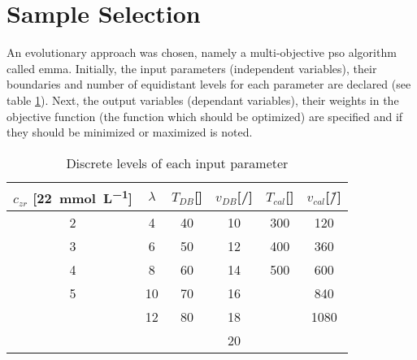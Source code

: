 \section{Sample Selection}
\label{sec:ss}
An evolutionary approach was chosen, namely a multi-objective 
\gls{pso} algorithm called \gls{emma}\cite{villanova2010function,Kennedy1995,Breiman1997,Carta2011}.
%
%
Initially, the input parameters (independent variables), their boundaries and number of equidistant levels for each parameter are declared (see table \ref{tab:input}).
Next, the output variables (dependant variables), their weights in the objective function (the function which should be optimized) are specified and if they should be minimized or maximized is noted.
%
\begin{table}[htb]
	\centering
	\begin{tabular}{cc cc cc}
		\hline\hline
        $c_{zr}$ [\SI{22}{\milli\mol\per\liter}]	&$\lambda$	&$T_{DB}$[\oc{}]	&$v_{DB}$[\mm{}/\s{}]	&$T_{cal}$[\oc{}]	&$v_{cal}$[\oc{}/\h{}]	\\
		\hline
		2				&4		&40					&10				&300				&120	\\
		3				&6		&50					&12				&400				&360	\\
		4				&8		&60					&14				&500				&600	\\
		5				&10		&70					&16				&					&840	\\
						&12		&80					&18				&					&1080	\\
						&		&					&20				&					&		\\
		\hline\hline
	\end{tabular}
	\caption{Discrete levels of each input parameter }
	\label{tab:input}
\end{table}


